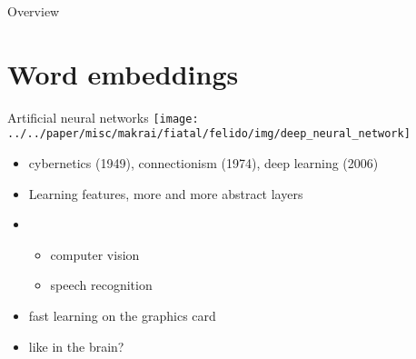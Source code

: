 \documentclass[10pt]{beamer}%
\author{%
  Márton Makrai}%
\title[Multi-sense word embeddings]{\parbox{\widthof\longline}{\longline \\ learn more senses?}}
\date{K + K = 120 Workshop 2017}
\begin{document}

\maketitle

\begin{frame}{Overview}
  \tableofcontents
\end{frame}


\section{Word embeddings}

\begin{frame}{Artificial neural networks}
\centering\texttt{[image: ../../paper/misc/makrai/fiatal/felido/img/deep\_neural\_network]}
  \begin{itemize}
    \item cybernetics (1949), connectionism (1974), deep learning (2006)
    \item Learning features, more and more abstract layers
    \item
      \begin{itemize}
        \item computer vision \citep{Krizhevsky:2012}
        \item speech recognition \citep{Hinton:2012}
      \end{itemize}
    \item fast learning on the graphics card
    \item like in the brain?
  \end{itemize}
\end{frame}
\end{document}
